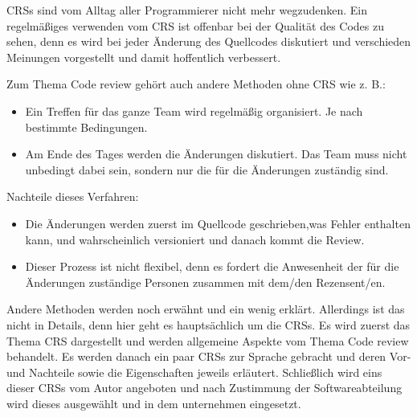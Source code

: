 
\acp{CRS} sind vom Alltag aller Programmierer nicht mehr wegzudenken. Ein regelmäßiges verwenden vom \ac{CRS} ist offenbar bei der Qualität des Codes zu sehen, denn es wird bei jeder Änderung des Quellcodes diskutiert und verschieden Meinungen vorgestellt und damit hoffentlich verbessert.

Zum Thema Code review gehört auch andere Methoden ohne \ac {CRS} wie \ac{z. B.}:

\begin{itemize}
\item Ein Treffen für das ganze Team wird regelmäßig organisiert. Je nach bestimmte 	  Bedingungen.
\item Am Ende des Tages werden die Änderungen diskutiert. Das Team muss nicht 			  unbedingt dabei sein, sondern nur die für die Änderungen zuständig sind.
\end{itemize} 

Nachteile dieses Verfahren:
\begin{itemize}
\item Die Änderungen werden zuerst im Quellcode geschrieben,was Fehler enthalten 		  kann, und wahrscheinlich versioniert und danach kommt die Review.
\item Dieser Prozess ist nicht flexibel, denn es fordert die Anwesenheit der für 		  die Änderungen zuständige Personen zusammen mit dem/den Rezensent/en.
\end{itemize}

Andere Methoden werden noch erwähnt und ein wenig erklärt. Allerdings ist das nicht in Details, denn hier geht es hauptsächlich um die \acp{CRS}.
Es wird zuerst das Thema \ac{CRS} dargestellt und werden allgemeine Aspekte vom Thema Code review behandelt.
Es werden danach ein paar \acp{CRS} zur Sprache gebracht und deren Vor- und Nachteile sowie die Eigenschaften jeweils erläutert.
Schließlich wird eins dieser \acp{CRS} vom Autor angeboten und nach Zustimmung der Softwareabteilung wird dieses ausgewählt und in dem unternehmen eingesetzt.

